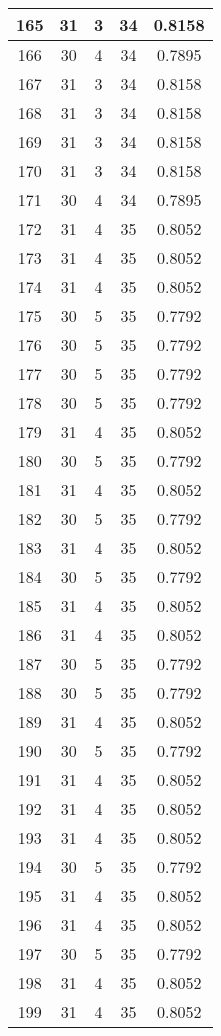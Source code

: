 \documentclass[letterpaper, 12pt]{article}
\begin{document}
\begin{longtable}{|c|c|c|c|c|}
\hline
165 & 31 & 3 & 34 & 0.8158 \\
\hline
166 & 30 & 4 & 34 & 0.7895 \\
\hline
167 & 31 & 3 & 34 & 0.8158 \\
\hline
168 & 31 & 3 & 34 & 0.8158 \\
\hline
169 & 31 & 3 & 34 & 0.8158 \\
\hline
170 & 31 & 3 & 34 & 0.8158 \\
\hline
171 & 30 & 4 & 34 & 0.7895 \\
\hline
172 & 31 & 4 & 35 & 0.8052 \\
\hline
173 & 31 & 4 & 35 & 0.8052 \\
\hline
174 & 31 & 4 & 35 & 0.8052 \\
\hline
175 & 30 & 5 & 35 & 0.7792 \\
\hline
176 & 30 & 5 & 35 & 0.7792 \\
\hline
177 & 30 & 5 & 35 & 0.7792 \\
\hline
178 & 30 & 5 & 35 & 0.7792 \\
\hline
179 & 31 & 4 & 35 & 0.8052 \\
\hline
180 & 30 & 5 & 35 & 0.7792 \\
\hline
181 & 31 & 4 & 35 & 0.8052 \\
\hline
182 & 30 & 5 & 35 & 0.7792 \\
\hline
183 & 31 & 4 & 35 & 0.8052 \\
\hline
184 & 30 & 5 & 35 & 0.7792 \\
\hline
185 & 31 & 4 & 35 & 0.8052 \\
\hline
186 & 31 & 4 & 35 & 0.8052 \\
\hline
187 & 30 & 5 & 35 & 0.7792 \\
\hline
188 & 30 & 5 & 35 & 0.7792 \\
\hline
189 & 31 & 4 & 35 & 0.8052 \\
\hline
190 & 30 & 5 & 35 & 0.7792 \\
\hline
191 & 31 & 4 & 35 & 0.8052 \\
\hline
192 & 31 & 4 & 35 & 0.8052 \\
\hline
193 & 31 & 4 & 35 & 0.8052 \\
\hline
194 & 30 & 5 & 35 & 0.7792 \\
\hline
195 & 31 & 4 & 35 & 0.8052 \\
\hline
196 & 31 & 4 & 35 & 0.8052 \\
\hline
197 & 30 & 5 & 35 & 0.7792 \\
\hline
198 & 31 & 4 & 35 & 0.8052 \\
\hline
199 & 31 & 4 & 35 & 0.8052 \\
\hline
\end{longtable}
\end{document}
